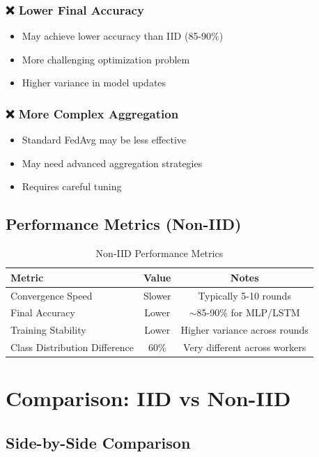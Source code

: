 \documentclass[12pt,a4paper]{article}
\begin{document}
\subsubsection{❌ Lower Final Accuracy}
\begin{itemize}
    \item May achieve lower accuracy than IID (85-90\%)
    \item More challenging optimization problem
    \item Higher variance in model updates
\end{itemize}

\subsubsection{❌ More Complex Aggregation}
\begin{itemize}
    \item Standard FedAvg may be less effective
    \item May need advanced aggregation strategies
    \item Requires careful tuning
\end{itemize}

\subsection{Performance Metrics (Non-IID)}

\begin{table}[h]
\centering
\begin{tabular}{@{}lcc@{}}
\toprule
\textbf{Metric} & \textbf{Value} & \textbf{Notes} \\
\midrule
Convergence Speed & Slower & Typically 5-10 rounds \\
Final Accuracy & Lower & $\sim$85-90\% for MLP/LSTM \\
Training Stability & Lower & Higher variance across rounds \\
Class Distribution Difference & 60\% & Very different across workers \\
\bottomrule
\end{tabular}
\caption{Non-IID Performance Metrics}
\end{table}

\section{Comparison: IID vs Non-IID}

\subsection{Side-by-Side Comparison}
\end{document}
